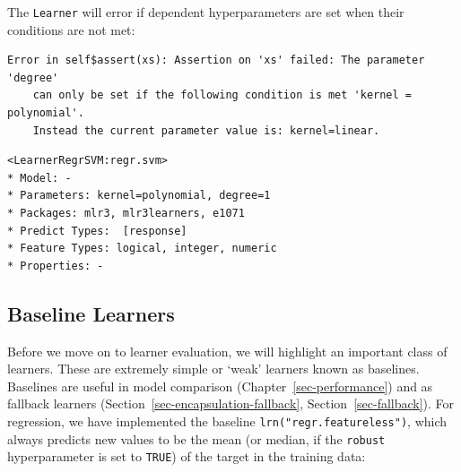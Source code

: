 The \texttt{Learner} will error if dependent hyperparameters are set
when their conditions are not met:

\begin{Shaded}
\begin{Highlighting}[]
\NormalTok{(}\NormalTok{, } \NormalTok{, } \NormalTok{)}
\end{Highlighting}
\end{Shaded}

\begin{verbatim}
Error in self$assert(xs): Assertion on 'xs' failed: The parameter 'degree'
	can only be set if the following condition is met 'kernel = polynomial'.
	Instead the current parameter value is: kernel=linear.
\end{verbatim}

\begin{Shaded}
\begin{Highlighting}[]
\NormalTok{(}\NormalTok{, } \NormalTok{, } \NormalTok{)}
\end{Highlighting}
\end{Shaded}

\begin{verbatim}
<LearnerRegrSVM:regr.svm>
* Model: -
* Parameters: kernel=polynomial, degree=1
* Packages: mlr3, mlr3learners, e1071
* Predict Types:  [response]
* Feature Types: logical, integer, numeric
* Properties: -
\end{verbatim}

\hypertarget{sec-basics-featureless}{%
\subsection{Baseline Learners}\label{sec-basics-featureless}}

Before we move on to learner evaluation, we will highlight an important
class of learners. These are extremely simple or `weak' learners known
as
baselines.
Baselines are useful in model comparison (Chapter~\ref{sec-performance})
and as fallback learners (Section~\ref{sec-encapsulation-fallback},
Section~\ref{sec-fallback}). For regression, we have implemented the
baseline \texttt{lrn("regr.featureless")}, which always predicts new
values to be the mean (or median, if the \texttt{robust} hyperparameter
is set to \texttt{TRUE}) of the target in the training data:

